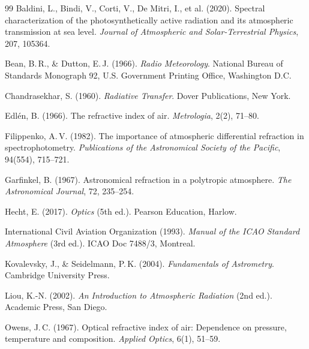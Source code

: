 ﻿\documentclass[12pt,a4paper]{article}
\begin{document}
\begin{thebibliography}{99}
Baldini, L., Bindi, V., Corti, V., De Mitri, I., et al. (2020).
\newblock Spectral characterization of the photosynthetically active radiation
  and its atmospheric transmission at sea level.
\newblock \textit{Journal of Atmospheric and Solar-Terrestrial Physics}, 207,
  105364.
\newblock {}

Bean, B.\,R., \& Dutton, E.\,J. (1966).
\newblock \textit{Radio Meteorology}.
\newblock National Bureau of Standards Monograph 92,
  U.S. Government Printing Office, Washington D.C.

Chandrasekhar, S. (1960).
\newblock \textit{Radiative Transfer}.
\newblock Dover Publications, New York.

Edlén, B. (1966).
\newblock The refractive index of air.
\newblock \textit{Metrologia}, 2(2), 71--80.
\newblock {}

Filippenko, A.\,V. (1982).
\newblock The importance of atmospheric differential refraction in
  spectrophotometry.
\newblock \textit{Publications of the Astronomical Society of the Pacific},
  94(554), 715--721.
\newblock {}

Garfinkel, B. (1967).
\newblock Astronomical refraction in a polytropic atmosphere.
\newblock \textit{The Astronomical Journal}, 72, 235--254.
\newblock {}

Hecht, E. (2017).
\newblock \textit{Optics} (5th ed.).
\newblock Pearson Education, Harlow.

International Civil Aviation Organization (1993).
\newblock \textit{Manual of the ICAO Standard Atmosphere} (3rd ed.).
\newblock ICAO Doc 7488/3, Montreal.

Kovalevsky, J., \& Seidelmann, P.\,K. (2004).
\newblock \textit{Fundamentals of Astrometry}.
\newblock Cambridge University Press.
\newblock {}

Liou, K.-N. (2002).
\newblock \textit{An Introduction to Atmospheric Radiation} (2nd ed.).
\newblock Academic Press, San Diego.

Owens, J.\,C. (1967).
\newblock Optical refractive index of air: Dependence on pressure, temperature
  and composition.
\newblock \textit{Applied Optics}, 6(1), 51--59.
\newblock {}


\end{thebibliography}
\end{document}
